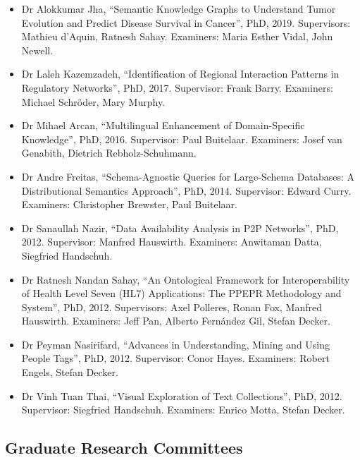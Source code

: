 \documentclass[10pt,a4paper]{res} %
\begin{document}
\begin{resume}
\begin{itemize}
\item Dr Alokkumar Jha, ``Semantic Knowledge Graphs to Understand Tumor Evolution and Predict Disease Survival in Cancer'', PhD, 2019. Supervisors: Mathieu d'Aquin, Ratnesh Sahay. Examiners: Maria Esther Vidal, John Newell.
\item Dr Laleh Kazemzadeh, ``Identification of Regional Interaction Patterns in Regulatory Networks'', PhD, 2017. Supervisor: Frank Barry. Examiners: Michael Schr\"{o}der, Mary Murphy.
\item Dr Mihael Arcan, ``Multilingual Enhancement of Domain-Specific Knowledge'', PhD, 2016. Supervisor: Paul Buitelaar. Examiners: Josef van Genabith, Dietrich Rebholz-Schuhmann.
\item Dr Andre Freitas, ``Schema-Agnostic Queries for Large-Schema Databases: A Distributional Semantics Approach'', PhD, 2014. Supervisor: Edward Curry. Examiners: Christopher Brewster, Paul Buitelaar.
\item Dr Sanaullah Nazir, ``Data Availability Analysis in P2P Networks'', PhD, 2012. Supervisor: Manfred Hauswirth. Examiners: Anwitaman Datta, Siegfried Handschuh.
\item Dr Ratnesh Nandan Sahay, ``An Ontological Framework for Interoperability of Health Level Seven (HL7) Applications: The PPEPR Methodology and System'', PhD, 2012. Supervisors: Axel Polleres, Ronan Fox, Manfred Hauswirth. Examiners: Jeff Pan, Alberto Fern\'{a}ndez Gil, Stefan Decker.
\item Dr Peyman Nasirifard, ``Advances in Understanding, Mining and Using People Tags'', PhD, 2012. Supervisor: Conor Hayes. Examiners: Robert Engels, Stefan Decker.
\item Dr Vinh Tuan Thai, ``Visual Exploration of Text Collections'', PhD, 2012. Supervisor: Siegfried Handschuh. Examiners: Enrico Motta, Stefan Decker.
\end{itemize}

\subsection*{Graduate Research Committees}


\end{resume}
\end{document}
